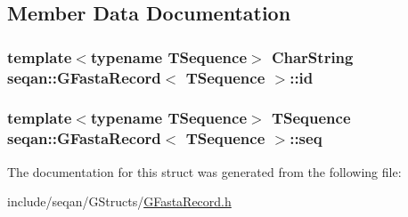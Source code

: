 \subsection{Member Data Documentation}
\hypertarget{structseqan_1_1_g_fasta_record_a9fc0e5fb39002e38b528f34906899941}{
\subsubsection[{id}]{\setlength{\rightskip}{0pt plus 5cm}template$<$typename T\-Sequence$>$ Char\-String {\bf seqan\-::\-G\-Fasta\-Record}$<$ T\-Sequence $>$\-::id}}\label{structseqan_1_1_g_fasta_record_a9fc0e5fb39002e38b528f34906899941}
\hypertarget{structseqan_1_1_g_fasta_record_a55a6d2deb7ef975f28a4aac89c779702}{
\subsubsection[{seq}]{\setlength{\rightskip}{0pt plus 5cm}template$<$typename T\-Sequence$>$ T\-Sequence {\bf seqan\-::\-G\-Fasta\-Record}$<$ T\-Sequence $>$\-::seq}}\label{structseqan_1_1_g_fasta_record_a55a6d2deb7ef975f28a4aac89c779702}


The documentation for this struct was generated from the following file\-:\begin{DoxyCompactItemize}
\item 
include/seqan/\-G\-Structs/\hyperlink{_g_fasta_record_8h}{G\-Fasta\-Record.\-h}\end{DoxyCompactItemize}
